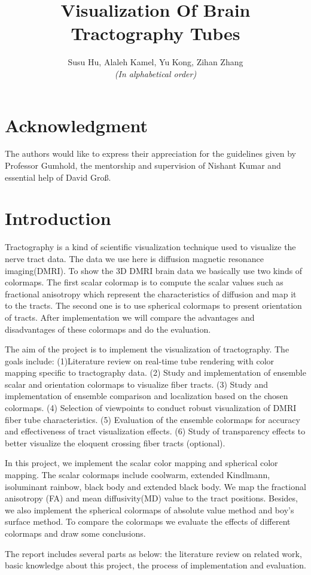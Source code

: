 \documentclass[hyperref, plainreport, noproblem]{cgvpub1}
\author{Susu Hu, Alaleh Kamel, Yu Kong, Zihan Zhang\\\small\textit{(In alphabetical order)}}
\title{Visualization Of Brain Tractography Tubes}
\begin{document}
\chapter*{Acknowledgment}
The authors would like to express their appreciation for the guidelines given by Professor Gumhold, the mentorship and supervision of Nishant Kumar and essential help of David Gro{\ss}.

\chapter{Introduction}

Tractography is a kind of scientific visualization technique used to visualize the nerve tract data. The data we use here is diffusion magnetic resonance imaging(DMRI). To show the 3D DMRI brain data we basically use two kinds of colormaps. The first scalar colormap is to compute the scalar values such as fractional anisotropy which represent the characteristics of diffusion and map it to the tracts. The second one is to use spherical colormaps to present orientation of tracts. After implementation we will compare the advantages and disadvantages of these colormaps and do the evaluation.

The aim of the project is to implement the visualization of tractography. The goals include: (1)Literature review on real-time tube rendering with color mapping specific to tractography data. (2) Study and implementation of ensemble scalar and orientation colormaps to visualize fiber tracts. (3) Study and implementation of ensemble comparison and localization based on the chosen colormaps. (4) Selection of viewpoints to conduct robust visualization of DMRI fiber tube characteristics. (5) Evaluation of the ensemble colormaps for accuracy and effectiveness of tract visualization effects. (6) Study of transparency effects to better visualize the eloquent crossing fiber tracts (optional).

In this project, we implement the scalar color mapping and spherical color mapping. The scalar colormaps include coolwarm, extended Kindlmann, isoluminant rainbow, black body and extended black body. We map the fractional anisotropy (FA) and mean diffusivity(MD) value to the tract positions. Besides, we also implement the spherical colormaps of absolute value method and boy’s surface method. To compare the colormaps we evaluate the effects of different colormaps and draw some conclusions.

The report includes several parts as below: the literature review on related work, basic knowledge about this project, the process of implementation and evaluation.
\end{document}
